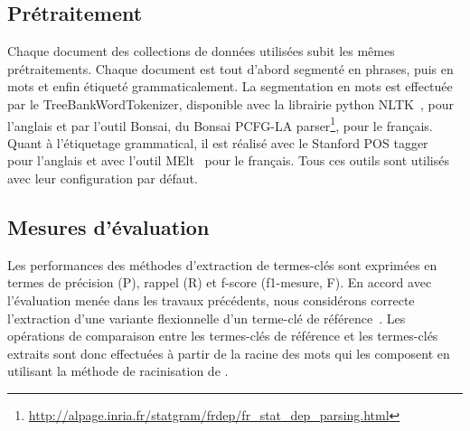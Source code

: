       \subsection{Prétraitement}
      \label{subsec:main-automatic_keyphrase_annotation-unsupervised_automatic_keyphrase_extraction-evaluation-preprocessing}
        Chaque document des collections de données utilisées subit les mêmes
        prétraitements. Chaque document est tout d'abord segmenté en phrases,
        puis en mots et enfin étiqueté grammaticalement. La segmentation en mots
        est effectuée par le TreeBankWordTokenizer, disponible avec la librairie
        python NLTK~\cite[\textit{Natural Language ToolKit}]{bird2009nltk}, pour
        l'anglais et par l'outil Bonsai, du Bonsai PCFG-LA
        parser\footnote{\url{http://alpage.inria.fr/statgram/frdep/fr_stat_dep_parsing.html}},
        pour le français. Quant à l'étiquetage grammatical, il est réalisé avec
        le Stanford POS tagger~\cite{toutanova2003stanfordpostagger} pour
        l'anglais et avec l'outil MElt~\cite{denis2009melt} pour le français.
        Tous ces outils sont utilisés avec leur configuration par défaut.

      \subsection{Mesures d'évaluation}
      \label{subsec:main-automatic_keyphrase_annotation-unsupervised_automatic_keyphrase_extraction-evaluation-evaluation_measures}
        Les performances des méthodes d'extraction de termes-clés sont exprimées
        en termes de précision (P), rappel (R) et f-score (f1-mesure, F). En
        accord avec l'évaluation menée dans les travaux précédents, nous
        considérons correcte l'extraction d'une variante flexionnelle d'un
        terme-clé de référence~\cite{kim2010semeval}. Les opérations de
        comparaison entre les termes-clés de référence et les termes-clés
        extraits sont donc effectuées à partir de la racine des mots qui les
        composent en utilisant la méthode de racinisation de
        .

